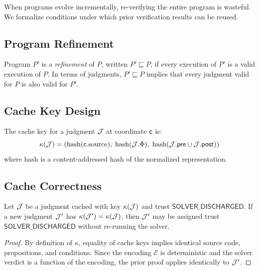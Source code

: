 \documentclass[11pt]{article}
\newcommand{\SolverDisch}{\ensuremath{\mathsf{SOLVER\_DISCHARGED}}}
\newcommand{\props}{\Phi}                           %
\newcommand{\precond}{\mathsf{pre}}                  %
\newcommand{\postcond}{\mathsf{post}}                %
\newcommand{\smtenc}{\mathcal{E}}
\newcommand{\CacheKey}{\kappa}
\newcommand{\RefineOp}{\sqsubseteq}
\begin{document}
When programs evolve incrementally, re-verifying the entire program
is wasteful.  We formalize conditions under which prior verification
results can be reused.

\subsection{Program Refinement}

\begin{definition}\label{def:refinement}
Program $P'$ is a \emph{refinement} of $P$, written $P' \RefineOp P$,
if every execution of $P'$ is a valid execution of $P$.  In terms
of judgments, $P' \RefineOp P$ implies that every judgment valid for
$P$ is also valid for $P'$.
\end{definition}

\subsection{Cache Key Design}

\begin{definition}\label{def:cache-key}
The cache key for a judgment $\mathcal{J}$ at coordinate $\mathsf{c}$ is:
\[
  \CacheKey(\J) = (\mathrm{hash}(\coord.\text{source}),\;
                   \mathrm{hash}(\J.\props),\;
                   \mathrm{hash}(\J.\precond \cup \J.\postcond))
\]
where $\mathrm{hash}$ is a content-addressed hash of the normalized
representation.
\end{definition}

\subsection{Cache Correctness}

\begin{theorem}\label{thm:cache-correct}
Let $\mathcal{J}$ be a judgment cached with key $\CacheKey(\J)$ and trust
$\SolverDisch$.  If a new judgment $\mathcal{J}'$ has $\CacheKey(\J') =
\CacheKey(\J)$, then $\mathcal{J}'$ may be assigned trust $\SolverDisch$
without re-running the solver.
\end{theorem}

\begin{proof}
By definition of $\CacheKey$, equality of cache keys implies
identical source code, propositions, and conditions.  Since the
encoding $\smtenc$ is deterministic and the solver verdict is
a function of the encoding, the prior proof applies identically
to $\mathcal{J}'$.
\end{proof}
\end{document}
